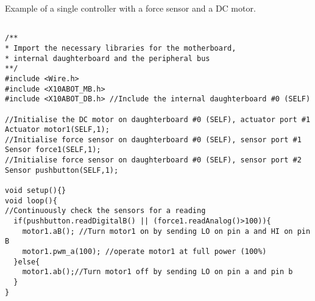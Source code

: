 \begin{listing}
		\footnotesize
		\caption{Example of a single controller with a force sensor and a DC motor.} \label{code:simpl}
		\begin{verbatim}

/**
* Import the necessary libraries for the motherboard, 
* internal daughterboard and the peripheral bus
**/
#include <Wire.h>  
#include <X10ABOT_MB.h>
#include <X10ABOT_DB.h> //Include the internal daughterboard #0 (SELF)

//Initialise the DC motor on daughterboard #0 (SELF), actuator port #1
Actuator motor1(SELF,1);
//Initialise force sensor on daughterboard #0 (SELF), sensor port #1
Sensor force1(SELF,1);
//Initialise force sensor on daughterboard #0 (SELF), sensor port #2
Sensor pushbutton(SELF,1);

void setup(){}
void loop(){
//Continuously check the sensors for a reading
  if(pushbutton.readDigitalB() || (force1.readAnalog()>100)){
    motor1.aB(); //Turn motor1 on by sending LO on pin a and HI on pin B
    motor1.pwm_a(100); //operate motor1 at full power (100%) 
  }else{
    motor1.ab();//Turn motor1 off by sending LO on pin a and pin b
  }
}	 
	\end{verbatim}
		
\end{listing}


